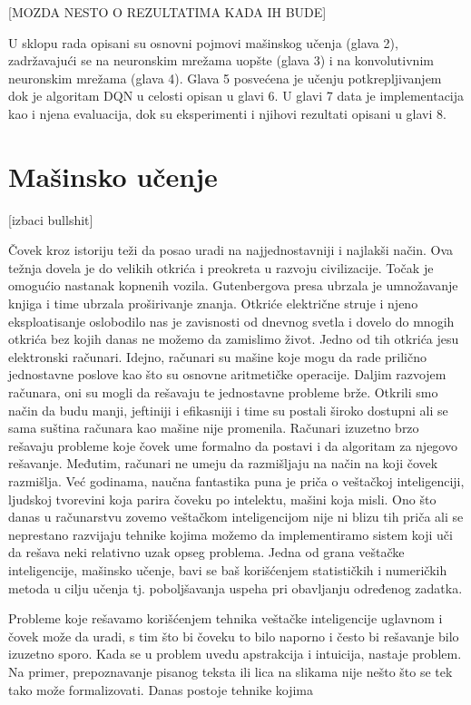 \documentclass{article}
\begin{document}
[MOZDA NESTO O REZULTATIMA KADA IH BUDE]


U sklopu rada opisani su osnovni pojmovi mašinskog učenja (glava 2), zadržavajući se na neuronskim mrežama uopšte (glava 3) i na konvolutivnim neuronskim mrežama (glava 4). Glava 5 posvećena je učenju potkrepljivanjem dok je algoritam DQN u celosti opisan u glavi 6. U glavi 7 data je implementacija kao i njena evaluacija, dok su eksperimenti i njihovi rezultati opisani u glavi 8. 

\section{Mašinsko učenje}


[izbaci bullshit]


Čovek kroz istoriju teži da posao uradi na najjednostavniji i najlakši način. Ova težnja dovela je do velikih otkrića i preokreta u razvoju civilizacije. Točak je omogućio nastanak kopnenih vozila. Gutenbergova presa ubrzala je umnožavanje knjiga i time ubrzala proširivanje znanja. Otkriće električne struje i njeno eksploatisanje oslobodilo nas je zavisnosti od dnevnog svetla i dovelo do mnogih otkrića bez kojih danas ne možemo da zamislimo život. Jedno od tih otkrića jesu elektronski računari. Idejno, računari su mašine koje mogu da rade prilično jednostavne poslove kao što su osnovne aritmetičke operacije. Daljim razvojem računara, oni su mogli da rešavaju te jednostavne probleme brže. Otkrili smo način da budu manji, jeftiniji i efikasniji i time su postali široko dostupni ali se sama suština računara kao mašine nije promenila. Računari izuzetno brzo rešavaju probleme koje čovek ume formalno da postavi i da algoritam za njegovo rešavanje. Međutim, računari ne umeju da razmišljaju na način na koji čovek razmišlja. Već godinama, naučna fantastika puna je priča o veštačkoj inteligenciji, ljudskoj tvorevini koja parira čoveku po intelektu, mašini koja misli. Ono što danas u računarstvu zovemo veštačkom inteligencijom nije ni blizu tih priča ali se neprestano razvijaju tehnike kojima možemo da implementiramo sistem koji uči da rešava neki relativno uzak opseg problema. 
Jedna od grana veštačke inteligencije, mašinsko učenje, bavi se baš korišćenjem statističkih i numeričkih metoda u cilju učenja tj. poboljšavanja uspeha pri obavljanju određenog zadatka. 

Probleme koje rešavamo korišćenjem tehnika veštačke inteligencije uglavnom i čovek može da uradi, s tim što bi čoveku to bilo naporno i često bi rešavanje bilo izuzetno sporo.
Kada se u problem uvedu apstrakcija i intuicija, nastaje problem. Na primer, prepoznavanje pisanog teksta ili lica na slikama nije nešto što se tek tako može formalizovati. 
Danas postoje tehnike kojima 
\end{document}
